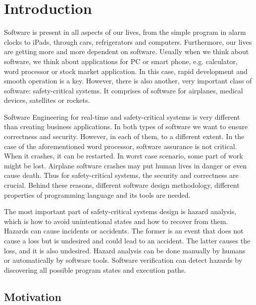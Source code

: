 
\cleardoublepage

\chapter{Introduction}
\label{introduction}

Software is present in all aspects of our lives, from the simple program in alarm clocks to iPads, through cars, refrigerators and computers. Furthermore, our lives are getting more and more dependent on software. Usually when we think about software, we think about applications for PC or smart phone, e.g. calculator, word processor or stock market application. In this case, rapid development and smooth operation is a key. However, there is also another, very important class of software: safety-critical systems. It comprises of software for airplanes, medical devices, satellites or rockets.

Software Engineering for real-time and safety-critical systems is very different than creating business applications. In both types of software we want to ensure correctness and security. However, in each of them, to a different extent. In the case of the aforementioned word processor, software assurance is not critical. When it crashes, it can be restarted. In worst case scenario, some part of work might be lost. Airplane software crashes may put human lives in danger or even cause death. Thus for safety-critical systems, the security and correctness are crucial. Behind these reasons, different software design methodology, different properties of programming language and its tools are needed.

The most important part of safety-critical systems design is hazard analysis, which is how to avoid unintentional states and how to recover from them. Hazards can cause incidents or accidents. The former is an event that does not cause a loss but is undesired and could lead to an accident. The latter causes the loss, and it is also undesired. Hazard analysis can be done manually by humans or automatically by software tools. Software verification can detect hazards by discovering all possible program states and execution paths.


\section{Motivation}
\label{introduction:motivation}

